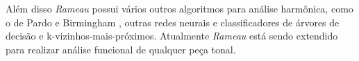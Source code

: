 \documentclass{article}
\newcommand{\rameau}{\textit{Rameau}}
\begin{document}
Além disso \rameau{}  possui vários outros algoritmos para análise
harmônica, como o de Pardo e Birmingham \cite{pardo.ea00:automated},
outras redes neurais e classificadores de árvores de decisão e
k-vizinhos-mais-próximos. Atualmente \rameau{}  está sendo extendido para
realizar análise funcional de qualquer peça tonal.


\renewcommand{\refname}{Referências Bibliográficas}



\end{document}
